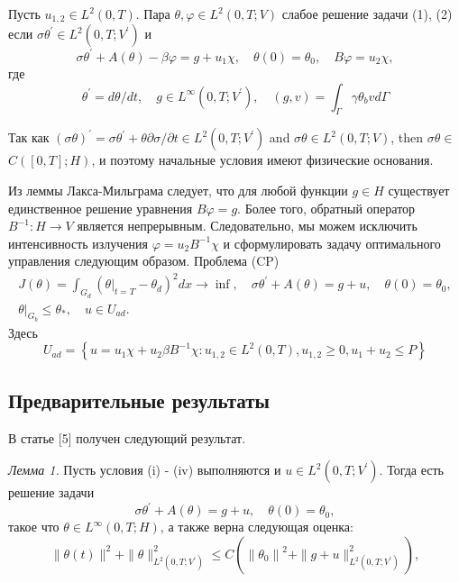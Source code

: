 \begin{definition} Пусть $u_{1,2} \in L^{2}(0, T)$.
Пара $\theta, \varphi \in L^{2}(0, T ; V)$ слабое решение задачи (1), (2) если
$\sigma \theta^{\prime} \in L^{2}\left(0, T ; V^{\prime}\right)$ и
\[
    \sigma \theta^{\prime}+A(\theta)-\beta \varphi=g+u_{1} \chi,
    \quad \theta(0)=\theta_{0}, \quad B \varphi=u_{2} \chi,
\]
где
\[
    \theta^{\prime}=d \theta / d t, \quad g \in L^{\infty}\left(0, T ; V^{\prime}\right),
    \quad(g, v)=\int_{\Gamma} \gamma \theta_{b} v d \Gamma
\]
\end{definition}

\begin{remark}
Так как $(\sigma \theta)^{\prime}=\sigma \theta^{\prime}+\theta
\partial \sigma / \partial t \in L^{2}\left(0, T ; V^{\prime}\right)$ and $\sigma
\theta \in L^{2}(0, T ; V)$, then $\sigma \theta \in$ $C([0, T] ; H)$,
и поэтому начальные условия имеют физические основания.
\end{remark}

Из леммы Лакса-Мильграма следует, что для любой функции $g \in H$ существует единственное
решение уравнения $B\varphi= g$.
Более того, обратный оператор $B ^{-1}: H \rightarrow V$ является непрерывным.
Следовательно, мы можем исключить интенсивность излучения $\varphi=u_{2} B ^ {-1} \chi$
и сформулировать задачу оптимального управления следующим образом.
Проблема (CP)
\[
    \begin{gathered}
        J(\theta)=\int_{G_{d}}\left(\left.\theta\right|_{t=T}
        - \theta_{d}\right)^{2} d x \rightarrow \inf,
        \quad \sigma \theta^{\prime}+A(\theta)=g+u, \quad \theta(0)=\theta_{0}, \\
        \left.\theta\right|_{G_{b}} \leq \theta_{*}, \quad u \in U_{a d}.
    \end{gathered}
\]
Здесь
\[
    U_{a d}=\left\{u=u_{1} \chi+u_{2} \beta B^{-1} \chi: u_{1,2} \in L^{2}(0, T), u_{1,2}
    \geq 0, u_{1}+u_{2} \leq P\right\}
\]

\subsection{Предварительные результаты}\label{subsec:ch3:sec3:subsec3}
В статье [5] получен следующий результат.

\textit{Лемма 1.}
Пусть условия (i) - (iv) выполняются и $u \in L^{2}\left(0, T ; V^{\prime}\right)$.
Тогда есть решение задачи
\[
    \sigma \theta^{\prime}+A(\theta)=g+u, \quad \theta(0)=\theta_{0},
\]
такое что $\theta \in L^{\infty}(0, T ; H)$, а также верна следующая оценка:
\[
    \|\theta(t)\|^{2}+\|\theta\|_{L^{2}\left(0, T ; V^{\prime}\right)}^{2}
    \leq C\left(\left\|\theta_{0}\right\|^{2}+\|g+u\|_{L^{2}
    \left(0, T; V^{\prime}\right)}^{2}\right),
\]

